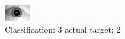 \begin{figure}[h!]
\begin{center}
\includegraphics[width=0.60\columnwidth]{figures/ID1789_class_3_target_2.png}
\end{center}
\caption{ Classification: 3 actual target: 2}
\label{fig:ID1789_class_3_target_2}
\end{figure}

